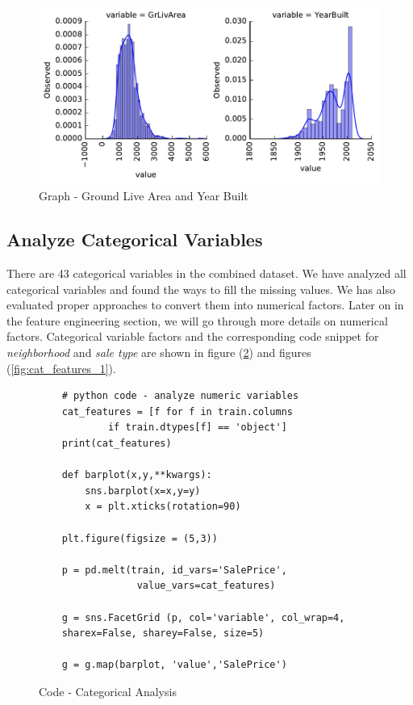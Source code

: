 \documentclass[sigconf]{acmart}
\begin{document}
	\begin{figure}[htb]
		\centering
		\includegraphics[width=0.75\columnwidth]{images/num_features_2}	
		\caption{Graph - Ground Live Area and Year Built} \label{fig:num_features_2} 
	\end{figure}

	\subsection{Analyze Categorical Variables}
	There are 43 categorical variables in the combined dataset. We have analyzed all categorical variables and found the ways to fill the missing values. We has also evaluated proper approaches to convert them into numerical factors. Later on in the feature engineering section, we will go through more details on numerical factors. Categorical variable factors and the corresponding code snippet for {\em neighborhood} and {\em sale type} are shown in figure (\ref{c:analyze-cat}) and figures (\ref{fig:cat_features_1}).
	
	\begin{figure}[htb]
	\begin{verbatim}	
	# python code - analyze numeric variables
	cat_features = [f for f in train.columns 
			if train.dtypes[f] == 'object']
	print(cat_features)
	
	def barplot(x,y,**kwargs):
	    sns.barplot(x=x,y=y)
	    x = plt.xticks(rotation=90)
	
	plt.figure(figsize = (5,3))
	
	p = pd.melt(train, id_vars='SalePrice',
	             value_vars=cat_features)
	             
	g = sns.FacetGrid (p, col='variable', col_wrap=4, 
	sharex=False, sharey=False, size=5)
	
	g = g.map(barplot, 'value','SalePrice')				
	\end{verbatim}
	\caption{Code - Categorical Analysis} \label{c:analyze-cat} 
	\end{figure}
\end{document}
